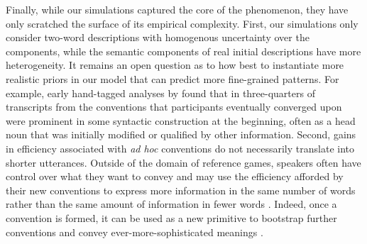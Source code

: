 Finally, while our simulations captured the core of the phenomenon, they have only scratched the surface of its empirical complexity.
First, our simulations only consider two-word descriptions with homogenous uncertainty over the components, while the semantic components of real initial descriptions have more heterogeneity. 
It remains an open question as to how best to instantiate more realistic priors in our model that can predict more fine-grained patterns. 
For example, early hand-tagged analyses by  found that in three-quarters of transcripts from  the conventions that participants eventually converged upon were prominent in some syntactic construction at the beginning, often as a head noun that was initially modified or qualified by other information. 
Second, gains in efficiency associated with \emph{ad hoc} conventions do not necessarily translate into shorter utterances.
Outside of the domain of reference games, speakers often have control over what they want to convey and may use the efficiency afforded by their new conventions to express more information in the same number of words rather than the same amount of information in fewer words \cite{effenberger2021analysis}. 
Indeed, once a convention is formed, it can be used as a new primitive to bootstrap further conventions and convey ever-more-sophisticated meanings \cite{mccarthy2021learning}.





